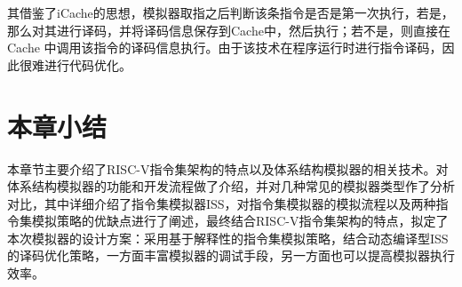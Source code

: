 其借鉴了iCache的思想，模拟器取指之后判断该条指令是否是第一次执行，若是，那么对其进行译码，并将译码信息保存到Cache中，然后执行；若不是，则直接在 Cache 中调用该指令的译码信息执行。由于该技术在程序运行时进行指令译码，因此很难进行代码优化。

\section{本章小结}
本章节主要介绍了RISC-V指令集架构的特点以及体系结构模拟器的相关技术。对体系结构模拟器的功能和开发流程做了介绍，并对几种常见的模拟器类型作了分析对比，其中详细介绍了指令集模拟器ISS，对指令集模拟器的模拟流程以及两种指令集模拟策略的优缺点进行了阐述，最终结合RISC-V指令集架构的特点，拟定了本次模拟器的设计方案：采用基于解释性的指令集模拟策略，结合动态编译型ISS的译码优化策略，一方面丰富模拟器的调试手段，另一方面也可以提高模拟器执行效率。